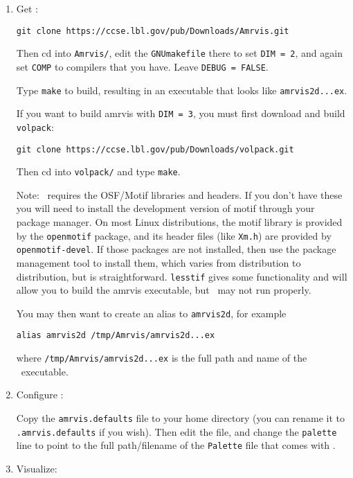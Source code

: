 \begin{enumerate}

\item Get \amrvis:

\begin{verbatim}
git clone https://ccse.lbl.gov/pub/Downloads/Amrvis.git
\end{verbatim}

Then cd into {\tt Amrvis/}, edit the {\tt GNUmakefile} there
to set {\tt DIM = 2}, and again set {\tt COMP} to compilers that
you have. Leave {\tt DEBUG = FALSE}.

Type {\tt make} to build, resulting in an executable that
looks like {\tt amrvis2d...ex}.

If you want to build amrvis with {\tt DIM = 3}, you must first
download and build {\tt volpack}:
\begin{verbatim}
git clone https://ccse.lbl.gov/pub/Downloads/volpack.git
\end{verbatim}

Then cd into {\tt volpack/} and type {\tt make}.

Note: \amrvis\ requires the OSF/Motif libraries and headers. If you don't have these 
you will need to install the development version of motif through your package manager. 
On most Linux distributions, the motif library is provided by the
{\tt openmotif} package, and its header files (like {\tt Xm.h}) are provided
by {\tt openmotif-devel}.  If those packages are not installed, then use the
package management tool to install them, which varies from
distribution to distribution, but is straightforward. 
{\tt lesstif} gives some functionality and will allow you to build the amrvis executable, 
but \amrvis\ may not run properly.

You may then want to create an alias to {\tt amrvis2d}, for example
\begin{verbatim}
alias amrvis2d /tmp/Amrvis/amrvis2d...ex
\end{verbatim}
where {\tt /tmp/Amrvis/amrvis2d...ex} is the full path and name of the \amrvis\ executable.

\item Configure \amrvis:  

  Copy the {\tt amrvis.defaults} file to your home directory (you can
  rename it to {\tt .amrvis.defaults} if you wish).  Then edit the
  file, and change the {\tt palette} line to point to the full
  path/filename of the {\tt Palette} file that comes with \amrvis.

\item Visualize:


\end{enumerate}
